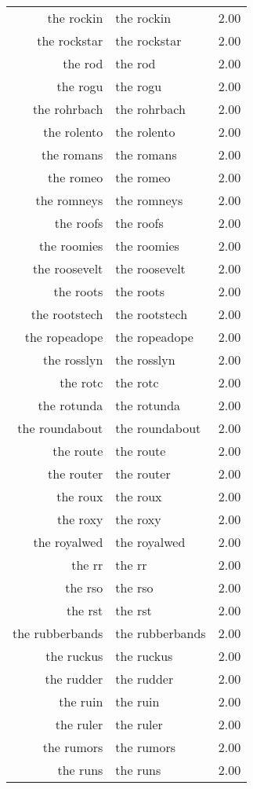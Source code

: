 \begin{table}[ht]
\begin{tabular}{rlr}
  the rockin & the rockin & 2.00 \\ 
  the rockstar & the rockstar & 2.00 \\ 
  the rod & the rod & 2.00 \\ 
  the rogu & the rogu & 2.00 \\ 
  the rohrbach & the rohrbach & 2.00 \\ 
  the rolento & the rolento & 2.00 \\ 
  the romans & the romans & 2.00 \\ 
  the romeo & the romeo & 2.00 \\ 
  the romneys & the romneys & 2.00 \\ 
  the roofs & the roofs & 2.00 \\ 
  the roomies & the roomies & 2.00 \\ 
  the roosevelt & the roosevelt & 2.00 \\ 
  the roots & the roots & 2.00 \\ 
  the rootstech & the rootstech & 2.00 \\ 
  the ropeadope & the ropeadope & 2.00 \\ 
  the rosslyn & the rosslyn & 2.00 \\ 
  the rotc & the rotc & 2.00 \\ 
  the rotunda & the rotunda & 2.00 \\ 
  the roundabout & the roundabout & 2.00 \\ 
  the route & the route & 2.00 \\ 
  the router & the router & 2.00 \\ 
  the roux & the roux & 2.00 \\ 
  the roxy & the roxy & 2.00 \\ 
  the royalwed & the royalwed & 2.00 \\ 
  the rr & the rr & 2.00 \\ 
  the rso & the rso & 2.00 \\ 
  the rst & the rst & 2.00 \\ 
  the rubberbands & the rubberbands & 2.00 \\ 
  the ruckus & the ruckus & 2.00 \\ 
  the rudder & the rudder & 2.00 \\ 
  the ruin & the ruin & 2.00 \\ 
  the ruler & the ruler & 2.00 \\ 
  the rumors & the rumors & 2.00 \\ 
  the runs & the runs & 2.00 \\ 

\end{tabular}
\end{table}
